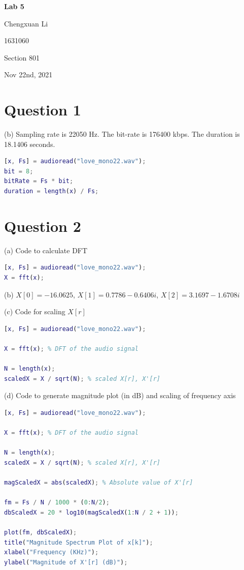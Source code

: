 \documentclass{article}
\begin{document}
\begin{titlepage}
\begin{center}
\vspace*{1cm}
		
\textbf{Lab 5}
			
\vspace{0.5cm}
Chengxuan Li
			
\vspace{0.1cm}
1631060
			
\vspace{0.1cm}
Section 801
			
\vspace{0.1cm}
Nov 22nd, 2021
\end{center}
\end{titlepage}

\section*{Question 1}

(b) Sampling rate is 22050 Hz. The bit-rate is 176400 kbps. The duration is 18.1406 seconds.
\begin{lstlisting}[language=Matlab]
[x, Fs] = audioread("love_mono22.wav");
bit = 8;
bitRate = Fs * bit;
duration = length(x) / Fs;
\end{lstlisting}

\section*{Question 2}

(a) Code to calculate DFT
\begin{lstlisting}[language=Matlab]
[x, Fs] = audioread("love_mono22.wav");
X = fft(x);
\end{lstlisting}

(b) $X[0]=-16.0625$, $X[1]=0.7786-0.6406i$, $X[2]=3.1697-1.6708i$

(c) Code for scaling $X[r]$
\begin{lstlisting}[language=Matlab]
[x, Fs] = audioread("love_mono22.wav");

X = fft(x); % DFT of the audio signal

N = length(x);
scaledX = X / sqrt(N); % scaled X[r], X'[r]
\end{lstlisting}

(d) Code to generate magnitude plot (in dB) and scaling of frequency axis
\begin{lstlisting}[language=Matlab]
[x, Fs] = audioread("love_mono22.wav");

X = fft(x); % DFT of the audio signal

N = length(x);
scaledX = X / sqrt(N); % scaled X[r], X'[r]

magScaledX = abs(scaledX); % Absolute value of X'[r]

fm = Fs / N / 1000 * (0:N/2);
dbScaledX = 20 * log10(magScaledX(1:N / 2 + 1));

plot(fm, dbScaledX);
title("Magnitude Spectrum Plot of x[k]");
xlabel("Frequency (KHz)");
ylabel("Magnitude of X'[r] (dB)");
\end{lstlisting}
\end{document}
